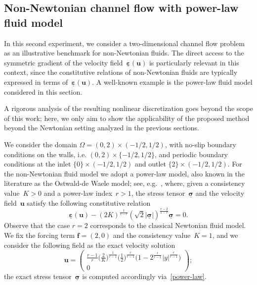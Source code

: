 \documentclass[a4paper,twoside,10pt]{article}
\theoremstyle{plain}
\theoremstyle{remark}
\theoremstyle{definition}
\numberwithin{equation}{section}
\numberwithin{figure}{section}
\newcommand{\sigmabf}{\underline{\boldsymbol{\sigma}}}
\newcommand{\ubf}{\mathbf{u}}
\newcommand{\fbf}{\mathbf{f}}
\newcommand{\epsbfun}{\underline{\boldsymbol{\varepsilon}}}
\begin{document}
\subsection{Non-Newtonian channel flow with power-law fluid model} \label{subsection:channel-flow}

In this second experiment,
we consider a two-dimensional channel flow problem
as an illustrative benchmark for non-Newtonian fluids.
The direct access to the symmetric gradient of the velocity field~$\epsbfun(\ubf)$
is particularly relevant in this context,
since the constitutive relations of non-Newtonian fluids
are typically expressed in terms of~$\epsbfun(\ubf)$.
A well-known example is the power-law fluid model considered in this section.

A rigorous analysis of the resulting nonlinear discretization
goes beyond the scope of this work;
here,
we only aim to show the applicability
of the proposed method beyond the Newtonian setting
analyzed in the previous sections.

We consider the domain $\Omega = (0,2)\times(-1/2,1/2)$,
with no-slip boundary conditions on the walls, i.e. $(0,2) \times \{ -1/2, 1/2 \}$,
and periodic boundary conditions at the inlet $\{ 0 \} \times (-1/2,1/2)$ and outlet $\{ 2 \} \times (-1/2,1/2)$.
For the non-Newtonian fluid model we adopt a power-law model,
also known in the literature as the Ostwald-de Waele model;
see, e.g.~\cite{Glowinski-Wachs:2011},
where,
given a consistency value~$K>0$ and a power-law index~$r>1$,
the stress tensor~$\sigmabf$ and the velocity field~$\ubf$ 
satisfy the following constitutive relation
\begin{equation} \label{power-law}
\epsbfun(\ubf) - (2K)^{\frac{1}{1-r}}(\sqrt{2}|\sigmabf|)^{\frac{r-2}{1-r}}\sigmabf = 0.
\end{equation}
Observe that the case $r=2$ corresponds to the classical Newtonian fluid model.
We fix the forcing term $\fbf = (2,0)$
and the consistency value~$K=1$,
and we consider the following field as the exact velocity solution 
\begin{equation*}
\ubf =
\left(
\begin{array}{c}
\frac{r-1}{r}\Big(\frac{2}{K}\Big)^{\frac{1}{r-1}}\Big(\frac12\Big)^{\frac{r}{r-1}}\Big(1-2^{\frac{r}{r-1}}|y|^{\frac{r}{r-1}}\Big)  \\
0
\end{array}
\right)
;
\end{equation*}
the exact stress tensor~$\sigmabf$ is computed accordingly via~\eqref{power-law}.
\end{document}
